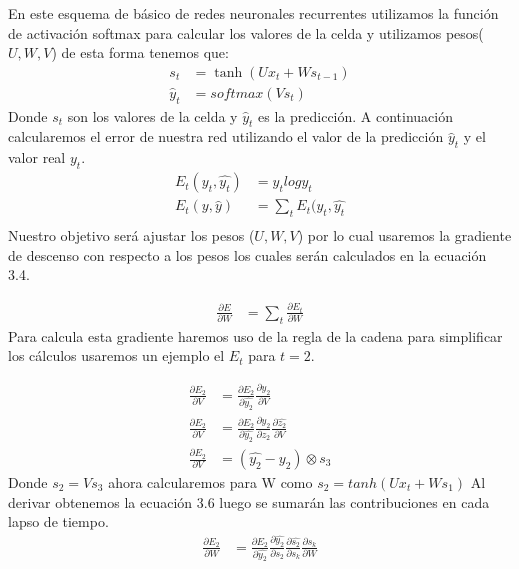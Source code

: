 En este esquema de básico de redes neuronales recurrentes utilizamos la función de activación softmax para calcular los valores de la celda y utilizamos pesos($U,W,V$) de esta forma tenemos que:
\begin{equation}
	\label{ST}
	\begin{aligned}
	s_{t}&=\tanh(Ux_{t}+Ws_{t-1})\\
	\hat{y}_{t}&=softmax(Vs_{t})
	\end{aligned}
\end{equation}
Donde $s_{t}$ son los valores de la celda y $\hat{y}_{t}$ es la predicción. A continuación calcularemos el error de nuestra red utilizando el valor de la predicción $\hat{y}_{t}$ y el valor real $y_{t}$.
\begin{equation}
	\label{STs}
	\begin{aligned}
		E_{t}(y_{t},\hat{y_{t}})&=y_{t}logy_{t}\\
		E_{t}(y,\hat{y})&=\sum_{t}{E_{t}(y_{t},\hat{y_{t}}}\\
	\end{aligned}
\end{equation}
Nuestro objetivo será ajustar los pesos ($U,W,V$) por lo cual usaremos la gradiente de descenso con respecto a los pesos los cuales serán calculados en la ecuación 3.4.

\begin{equation}
\label{Ts}
\begin{aligned}
	\frac{\partial E}{\partial W}&=\sum_{t}{\frac{\partial E_{t}}{\partial W}}
\end{aligned}
\end{equation}
Para calcula esta gradiente haremos uso de la regla de la cadena para simplificar los cálculos usaremos un ejemplo el $E_{t}$ para $t=2$.


\begin{equation}
\label{Tsfs}
	\begin{aligned}
	\frac{\partial E_{2}}{\partial V}&=\frac{\partial E_{2}}{\partial \hat{y_{2}}} \frac{\partial \hat{y_{2}}}{\partial V}\\
	\frac{\partial E_{2}}{\partial V}&=\frac{\partial E_{2}}{\partial \hat{y_{2}}} \frac{\partial \hat{y_{2}}}{\partial z_{2}} \frac{\partial \hat{z_{2}}}{\partial V}\\
	\frac{\partial E_{2}}{\partial V}&=(\hat{y_{2}}-y_{2})\otimes s_{3}
	\end{aligned}
\end{equation}
Donde $s_{2}=Vs_{3}$ ahora calcularemos para W como $s_{2}=tanh(Ux_{t}+ Ws_{1})$
Al derivar obtenemos la ecuación 3.6 luego se sumarán las contribuciones en cada lapso de tiempo.
\begin{equation}
\label{TsSfs}
	\begin{aligned}
		\frac{\partial E_{2}}{\partial W}&=\frac{\partial E_{2}}{\partial \hat{y_{2}}} \frac{\partial \hat{y_{2}}}{\partial s_{2}} \frac{\partial \hat{s_{2}}}{\partial s_{k}} \frac{\partial s_{k}}{\partial W}
	\end{aligned}
\end{equation}

